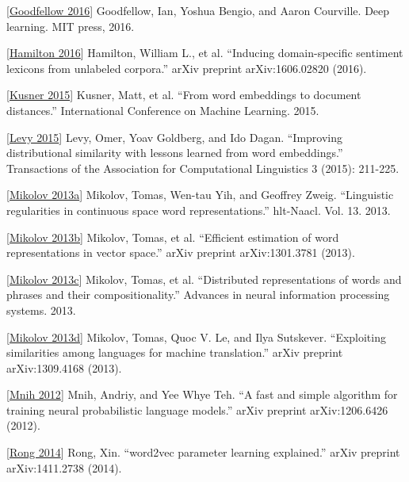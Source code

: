 \documentclass[11pt]{article}
\begin{document}
{[}\href{http://www.deeplearningbook.org/}{Goodfellow 2016}{]}
Goodfellow, Ian, Yoshua Bengio, and Aaron Courville. Deep learning. MIT
press, 2016.

{[}\href{https://arxiv.org/pdf/1606.02820.pdf}{Hamilton 2016}{]}
Hamilton, William L., et al. ``Inducing domain-specific sentiment
lexicons from unlabeled corpora.'' arXiv preprint arXiv:1606.02820
(2016).

{[}\href{https://arxiv.org/pdf/1506.06726.pdf}{Kusner 2015}{]} Kusner,
Matt, et al. ``From word embeddings to document distances.''
International Conference on Machine Learning. 2015.

{[}\href{https://levyomer.files.wordpress.com/2015/03/improving-distributional-similarity-tacl-2015.pdf}{Levy
2015}{]} Levy, Omer, Yoav Goldberg, and Ido Dagan. ``Improving
distributional similarity with lessons learned from word embeddings.''
Transactions of the Association for Computational Linguistics 3 (2015):
211-225.

{[}\href{http://www.aclweb.org/anthology/N13-1090}{Mikolov 2013a}{]}
Mikolov, Tomas, Wen-tau Yih, and Geoffrey Zweig. ``Linguistic
regularities in continuous space word representations.'' hlt-Naacl. Vol.
13. 2013.

{[}\href{https://arxiv.org/pdf/1301.3781.pdf}{Mikolov 2013b}{]} Mikolov,
Tomas, et al. ``Efficient estimation of word representations in vector
space.'' arXiv preprint arXiv:1301.3781 (2013).

{[}\href{https://arxiv.org/pdf/1310.4546.pdf}{Mikolov 2013c}{]} Mikolov,
Tomas, et al. ``Distributed representations of words and phrases and
their compositionality.'' Advances in neural information processing
systems. 2013.

{[}\href{https://arxiv.org/pdf/1309.4168.pdf}{Mikolov 2013d}{]} Mikolov,
Tomas, Quoc V. Le, and Ilya Sutskever. ``Exploiting similarities among
languages for machine translation.'' arXiv preprint arXiv:1309.4168
(2013).

{[}\href{https://arxiv.org/pdf/1206.6426.pdf}{Mnih 2012}{]} Mnih,
Andriy, and Yee Whye Teh. ``A fast and simple algorithm for training
neural probabilistic language models.'' arXiv preprint arXiv:1206.6426
(2012).

{[}\href{https://arxiv.org/pdf/1411.2738.pdf}{Rong 2014}{]} Rong, Xin.
``word2vec parameter learning explained.'' arXiv preprint
arXiv:1411.2738 (2014).
\end{document}

